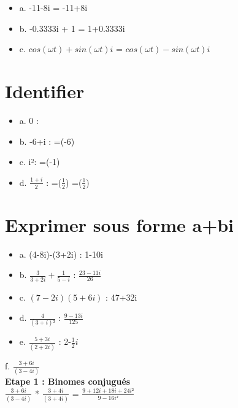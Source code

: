 \begin{itemize}
\item {a. -11-8i = -11+8i}
\item {b. -0.3333i + 1 = 1+0.3333i}
\item {c. $cos(\omega t) + sin(\omega t)i$ = $cos(\omega t) - sin(\omega t)i$ }
\end{itemize}


\vspace{3mm} %
\section{Identifier \R $  $ \I}
\vspace{3mm} %

\begin{itemize}
\item {a. 0 :   }
\item {b. -6+i : \R=(-6) }
\item {c. i²: \R=(-1) }
\item {d. $\frac{1+i}{2}$ : \R=($\frac{1}{2}$) \I=($\frac{1}{2}$)}
\end{itemize}


\vspace{3mm} %
\section{Exprimer sous forme a+bi}
\vspace{3mm} %

\begin{itemize}
\item {a. (4-8i)-(3+2i) : 1-10i}
\item {b. $\frac{3}{3+2i} + \frac{1}{5-i}$ : $\frac{23-11i}{26}$}
\item {c. $(7-2i)(5+6i)$ : 47+32i}
\item {d. $\frac{4}{(3+i)³}$ : $\frac{9-13i}{125}$}
\item {e. $\frac{5+3i}{(2+2i)}$ : 2-$\frac{1}{2}i$}
\end{itemize}
\vspace{8mm} %

f. $\frac{3+6i}{(3-4i)} $ \\

\textbf{Etape 1 : Binomes conjugués} \\

$\frac{3+6i}{(3-4i)}$ * $\frac{3+4i}{(3+4i)}$ = $\frac{9+12i+18i+24i²}{9-16i²}$ \\

